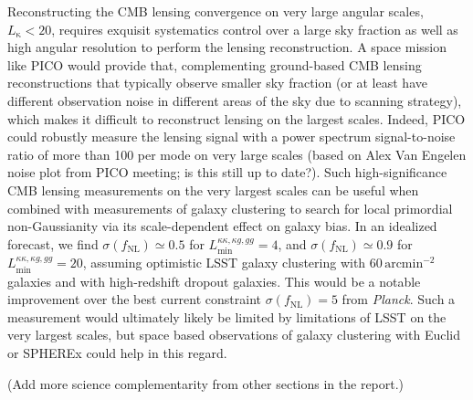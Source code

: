 \documentclass[PICOReport.tex]{subfiles}
\begin{document}
Reconstructing the CMB lensing convergence on very large angular scales, $L_\mathrm{\kappa}<20$, requires exquisit systematics control over a large sky fraction as well as high angular resolution to perform the lensing reconstruction. 
A space mission like PICO would provide that, complementing ground-based CMB lensing reconstructions that typically observe smaller sky fraction (or at least have different observation noise in different areas of the sky due to scanning strategy), which makes it difficult to reconstruct lensing on the largest scales. 
Indeed,  PICO could robustly measure the lensing signal with a power spectrum signal-to-noise ratio of more than 100 per mode on very large scales (based on Alex Van Engelen noise plot from PICO meeting; is this still up to date?).
Such high-significance CMB lensing measurements on the very largest scales can be useful when combined with measurements of  galaxy clustering to search for local primordial non-Gaussianity via its scale-dependent effect on galaxy bias.
In an idealized forecast, we find $\sigma(f_\mathrm{NL})\simeq 0.5$ for $L_\mathrm{min}^{\kappa\kappa,\kappa g,gg}=4$, and $\sigma(f_\mathrm{NL})\simeq 0.9$ for $L_\mathrm{min}^{\kappa\kappa,\kappa g,gg}=20$, assuming optimistic LSST galaxy clustering with $60\,\mathrm{arcmin}^{-2}$ galaxies and with high-redshift dropout galaxies.
This would be a notable improvement over the best current constraint $\sigma(f_\mathrm{NL})=5$ from {\it Planck}.
Such a measurement would ultimately likely be limited by limitations of LSST on the very largest scales, but space based observations of galaxy clustering with Euclid or SPHEREx could help in this regard.

(Add more science complementarity from other sections in the report.)
\end{document}
